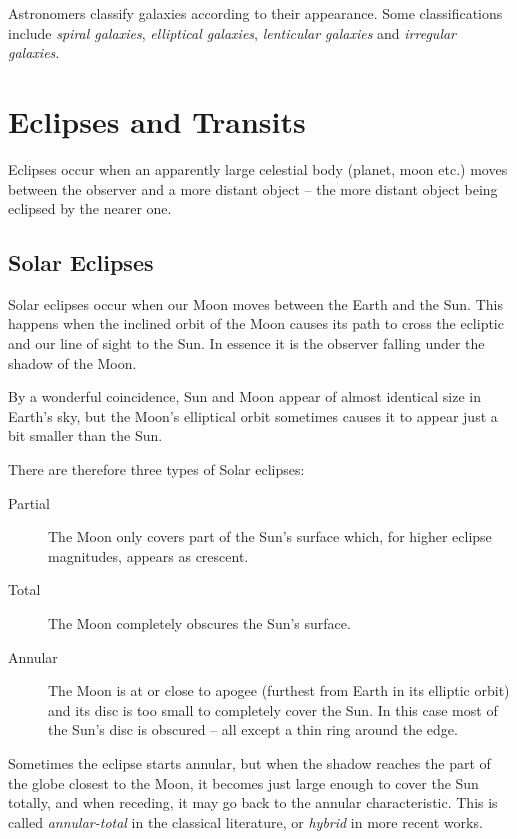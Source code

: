 Astronomers classify galaxies according to their appearance. Some
classifications include \emph{spiral galaxies}, \emph{elliptical
galaxies}, \emph{lenticular galaxies} and \emph{irregular galaxies}.



\section{Eclipses and Transits}
\label{sec:Eclipses}

Eclipses occur when an apparently large celestial body (planet, moon
etc.) moves between the observer and a more distant object
-- the more distant object being eclipsed by the nearer one.

\subsection{Solar Eclipses}
\label{sec:Eclipses:solar}

Solar eclipses occur when our Moon moves between the Earth and the Sun.
This happens when the inclined orbit of the Moon causes its path to
cross the ecliptic and our line of sight to the Sun. In essence it is the observer
falling under the shadow of the Moon. 

By a wonderful coincidence, Sun and Moon appear of almost identical
size in Earth's sky, but the Moon's elliptical orbit sometimes causes
it to appear just a bit smaller than the Sun.

There are therefore three types of Solar eclipses:
\begin{description}
\item[Partial] The Moon only covers part of the Sun's surface which, 
for higher eclipse magnitudes, appears as crescent.\nocite{Meeus:Morsels4}%
\item[Total] The Moon completely obscures the Sun's surface.
\item[Annular] The Moon is at or close to apogee (furthest from Earth in its
elliptic orbit) and its disc is too small to completely cover the Sun.
In this case most of the Sun's disc is obscured -- all except a thin ring
around the edge.
\end{description}
Sometimes the eclipse starts annular, but when the shadow reaches the
part of the globe closest to the Moon, it becomes just large enough to
cover the Sun totally, and when receding, it may go back to the
annular characteristic. This is called \emph{annular-total} in the
classical literature, or \emph{hybrid} in more recent works.

